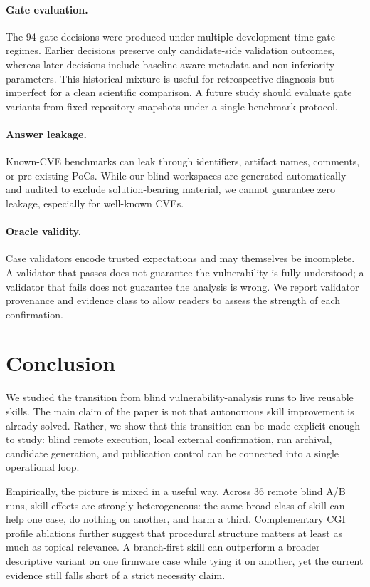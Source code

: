 ﻿\documentclass[preprint,12pt]{elsarticle}
\begin{document}
\paragraph{Gate evaluation.}
The 94 gate decisions were produced under multiple development-time gate
regimes.  Earlier decisions preserve only candidate-side validation
outcomes, whereas later decisions include baseline-aware metadata and
non-inferiority parameters.  This historical mixture is useful for
retrospective diagnosis but imperfect for a clean scientific comparison.  A
future study should evaluate gate variants from fixed repository snapshots
under a single benchmark protocol.

\paragraph{Answer leakage.}
Known-CVE benchmarks can leak through identifiers, artifact names,
comments, or pre-existing PoCs.  While our blind workspaces are generated
automatically and audited to exclude solution-bearing material, we cannot
guarantee zero leakage, especially for well-known CVEs.

\paragraph{Oracle validity.}
Case validators encode trusted expectations and may themselves be
incomplete.  A validator that passes does not guarantee the vulnerability
is fully understood; a validator that fails does not guarantee the analysis
is wrong.  We report validator provenance and evidence class to allow
readers to assess the strength of each confirmation.

\section{Conclusion}
\label{sec:conclusion}

We studied the transition from blind vulnerability-analysis runs to live
reusable skills.  The main claim of the paper is not that autonomous skill
improvement is already solved.  Rather, we show that this transition can be
made explicit enough to study: blind remote execution, local external
confirmation, run archival, candidate generation, and publication control
can be connected into a single operational loop.

Empirically, the picture is mixed in a useful way.  Across 36 remote blind
A/B runs, skill effects are strongly heterogeneous: the same broad class of
skill can help one case, do nothing on another, and harm a third.
Complementary CGI profile ablations further suggest that procedural
structure matters at least as much as topical relevance.  A branch-first
skill can outperform a broader descriptive variant on one firmware case
while tying it on another, yet the current evidence still falls short of a
strict necessity claim.
\end{document}
